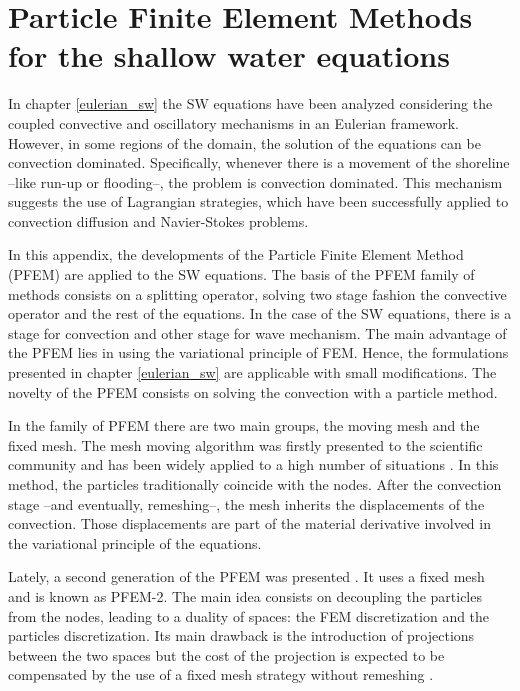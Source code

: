 
\chapter{Particle Finite Element Methods for the shallow water equations}
\label{lagrangian_sw}




In chapter \ref{eulerian_sw} the SW equations have been analyzed considering the coupled convective and oscillatory mechanisms in an Eulerian framework. However, in some regions of the domain, the solution of the equations can be convection dominated. Specifically, whenever there is a movement of the shoreline --like run-up or flooding--, the problem is convection dominated.
This mechanism suggests the use of Lagrangian strategies, which have been successfully applied to convection diffusion and Navier-Stokes problems.

In this appendix, the developments of the Particle Finite Element Method (PFEM) are applied to the SW equations. The basis of the PFEM family of methods consists on a splitting operator, solving two stage fashion the convective operator and the rest of the equations. In the case of the SW equations, there is a stage for convection and other stage for wave mechanism.
The main advantage of the PFEM lies in using the variational principle of FEM. Hence, the formulations presented in chapter \ref{eulerian_sw} are applicable with small modifications. The novelty of the PFEM consists on solving the convection with a particle method.

In the family of PFEM there are two main groups, the moving mesh and the fixed mesh. The mesh moving algorithm was firstly presented to the scientific community \cite{idelsohn2003,idelsohn2004} and has been widely applied to a high number of situations \cite{larese2008,Salazar2012,onate2008}. In this method, the particles traditionally coincide with the nodes. After the convection stage --and eventually, remeshing--, the mesh inherits the displacements of the convection. Those displacements are part of the material derivative involved in the variational principle of the equations.

Lately, a second generation of the PFEM was presented \cite{idelsohn2012}. It uses a fixed mesh and is known as PFEM-2. The main idea consists on decoupling the particles from the nodes, leading to a duality of spaces: the FEM discretization and the particles discretization. Its main drawback is the introduction of projections between the two spaces but the cost of the projection is expected to be compensated by the use of a fixed mesh strategy without remeshing \cite{idelsohn2015,puigferrat2021}.



